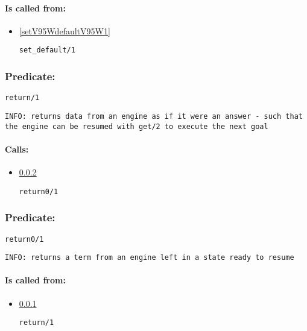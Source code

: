 \paragraph{Is called from:} 
\begin{itemize}
\item \ref{setV95WdefaultV95W1} 
\begin{verbatim}
set_default/1
\end{verbatim}

\end{itemize}

\subsubsection{Predicate:} \label{returnV95W1}

\begin{verbatim}
return/1
\end{verbatim}

{\small \begin{verbatim}
INFO: returns data from an engine as if it were an answer - such that the engine can be resumed with get/2 to execute the next goal

\end{verbatim}}
\paragraph{Calls:} 
\begin{itemize}
\item \ref{return0V95W1} 
\begin{verbatim}
return0/1
\end{verbatim}

\end{itemize}

\subsubsection{Predicate:} \label{return0V95W1}

\begin{verbatim}
return0/1
\end{verbatim}

{\small \begin{verbatim}
INFO: returns a term from an engine left in a state ready to resume

\end{verbatim}}
\paragraph{Is called from:} 
\begin{itemize}
\item \ref{returnV95W1} 
\begin{verbatim}
return/1
\end{verbatim}

\end{itemize}

